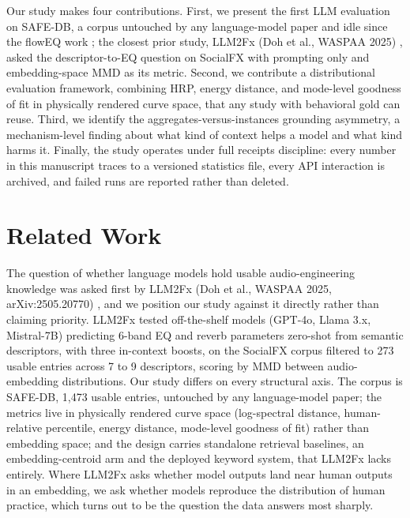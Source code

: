 \documentclass[11pt]{article}
\begin{document}
Our study makes four contributions. First, we present the first LLM evaluation on SAFE-DB, a corpus untouched by any language-model paper and idle since the flowEQ work \cite{steinmetz2019floweq}; the closest prior study, LLM2Fx (Doh et al., WASPAA 2025) \cite{doh2025llm2fx}, asked the descriptor-to-EQ question on SocialFX with prompting only and embedding-space MMD as its metric. Second, we contribute a distributional evaluation framework, combining HRP, energy distance, and mode-level goodness of fit in physically rendered curve space, that any study with behavioral gold can reuse. Third, we identify the aggregates-versus-instances grounding asymmetry, a mechanism-level finding about what kind of context helps a model and what kind harms it. Finally, the study operates under full receipts discipline: every number in this manuscript traces to a versioned statistics file, every API interaction is archived, and failed runs are reported rather than deleted.

\section{Related Work}

The question of whether language models hold usable audio-engineering knowledge was asked first by LLM2Fx (Doh et al., WASPAA 2025, arXiv:2505.20770) \cite{doh2025llm2fx}, and we position our study against it directly rather than claiming priority. LLM2Fx tested off-the-shelf models (GPT-4o, Llama 3.x, Mistral-7B) predicting 6-band EQ and reverb parameters zero-shot from semantic descriptors, with three in-context boosts, on the SocialFX corpus filtered to 273 usable entries across 7 to 9 descriptors, scoring by MMD between audio-embedding distributions. Our study differs on every structural axis. The corpus is SAFE-DB, 1,473 usable entries, untouched by any language-model paper; the metrics live in physically rendered curve space (log-spectral distance, human-relative percentile, energy distance, mode-level goodness of fit) rather than embedding space; and the design carries standalone retrieval baselines, an embedding-centroid arm and the deployed keyword system, that LLM2Fx lacks entirely. Where LLM2Fx asks whether model outputs land near human outputs in an embedding, we ask whether models reproduce the distribution of human practice, which turns out to be the question the data answers most sharply.
\end{document}
